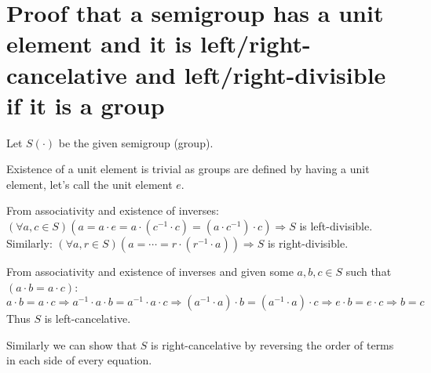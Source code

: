 \documentclass[11pt]{article}
\begin{document}
    \part*{Proof that a semigroup has a unit element and it is left/right-cancelative and left/right-divisible if it is a group}

    Let $S(\cdot)$ be the given semigroup (group).

    Existence of a unit element is trivial as groups are defined by having a unit element, let's call the unit element $e$.

    From associativity and existence of inverses: \\
    $(\forall a, c \in S)(a = a \cdot e = a \cdot (c^{-1} \cdot c) = (a \cdot c^{-1}) \cdot c) \Rightarrow S$ is left-divisible. \\
    Similarly: $(\forall a, r \in S)(a = \cdots = r \cdot (r^{-1} \cdot a)) \Rightarrow S$ is right-divisible.

    From associativity and existence of inverses and given some $a, b, c \in S$ such that $(a \cdot b = a \cdot c)$:
    $a \cdot b = a \cdot c \Rightarrow a^{-1} \cdot a \cdot b = a^{-1} \cdot a \cdot c \Rightarrow (a^{-1} \cdot a) \cdot b = (a^{-1} \cdot a) \cdot c \Rightarrow e \cdot b = e \cdot c \Rightarrow b = c$ \\
    Thus $S$ is left-cancelative.

    Similarly we can show that $S$ is right-cancelative by reversing the order of terms in each side of every equation.
\end{document}
